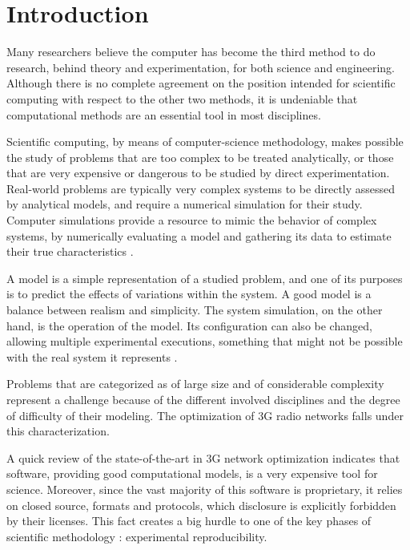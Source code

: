 
\chapter{Introduction}


\noindent Many researchers believe the computer has become the third
method to do research, behind theory and experimentation, for both
science and engineering. Although there is no complete agreement on
the position intended for scientific computing with respect to the
other two methods, it is undeniable that computational methods are
an essential tool in most disciplines.

Scientific computing, by means of computer-science methodology, makes
possible the study of problems that are too complex to be treated
analytically, or those that are very expensive or dangerous to be
studied by direct experimentation. Real-world problems are typically
very complex systems to be directly assessed by analytical models,
and require a numerical simulation for their study. Computer simulations
provide a resource to mimic the behavior of complex systems, by numerically
evaluating a model and gathering its data to estimate their true characteristics
\cite{law2007simulation}.

A model is a simple representation of a studied problem, and one of
its purposes is to predict the effects of variations within the system.
A good model is a balance between realism and simplicity. The system
simulation, on the other hand, is the operation of the model. Its
configuration can also be changed, allowing multiple experimental
executions, something that might not be possible with the real system
it represents \cite{maria1997introduction}.

Problems that are categorized as of large size and of considerable
complexity represent a challenge because of the different involved
disciplines and the degree of difficulty of their modeling. The optimization
of 3G radio networks falls under this characterization.

A quick review of the state-of-the-art in 3G network optimization
indicates that software, providing good computational models, is a
very expensive tool for science. Moreover, since the vast majority
of this software is proprietary, it relies on closed source, formats
and protocols, which disclosure is explicitly forbidden by their licenses.
This fact creates a big hurdle to one of the key phases of scientific
methodology \cite{gauch2002scientific}: experimental reproducibility.

